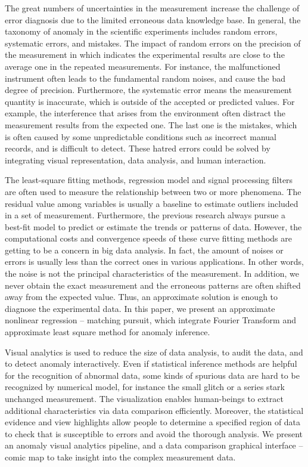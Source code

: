 \documentclass{vgtc}                          %
\begin{document}
The great numbers of uncertainties in the measurement increase the challenge of error diagnosis due to the limited erroneous data knowledge base. In general, the taxonomy of anomaly in the scientific experiments includes random errors, systematic errors, and mistakes. The impact of random errors on the precision of the measurement in which indicates the experimental results are close to the average one in the repeated measurements. For instance, the malfunctioned instrument often leads to the fundamental random noises, and cause the bad degree of precision. Furthermore, the systematic error means the measurement quantity is inaccurate, which is outside of the accepted or predicted values. For example, the interference that arises from the environment often distract the measurement results from the expected one. The last one is the mistakes, which is often caused by some unpredictable conditions such as incorrect manual records, and is difficult to detect. These hatred errors could be solved by integrating visual representation, data analysis, and human interaction.

The least-square fitting methods, regression model and signal processing filters are often used to measure the relationship between two or more phenomena. The residual value among variables is usually a baseline to estimate outliers included in a set of measurement. Furthermore, the previous research always pursue a best-fit model to predict or estimate the trends or patterns of data. However, the computational costs and convergence speeds of these curve fitting methods are getting to be a concern in big data analysis. In fact, the amount of noises or errors is usually less than the correct ones in various applications. In other words, the noise is not the principal characteristics of the measurement. In addition, we never obtain the exact measurement and the erroneous patterns are often shifted away from the expected value. Thus, an approximate solution is enough to diagnose the experimental data. In this paper, we present an approximate nonlinear regression -- matching pursuit, which integrate Fourier Transform and approximate least square method for anomaly inference.

Visual analytics is used to reduce the size of data analysis, to audit the data, and to detect anomaly interactively. Even if statistical inference methods are helpful for the recognition of abnormal data, some kinds of spurious data are hard to be recognized by numerical model, for instance the small glitch or a series stark unchanged measurement. The visualization enables human-beings to extract additional characteristics via data comparison efficiently. Moreover, the statistical evidence and view highlights allow people to determine a specified region of data to check that is susceptible to errors and avoid the thorough analysis. We present an anomaly visual analytics pipeline, and a data comparison graphical interface -- comic map to take insight into the complex measurement data.
	
\end{document}
